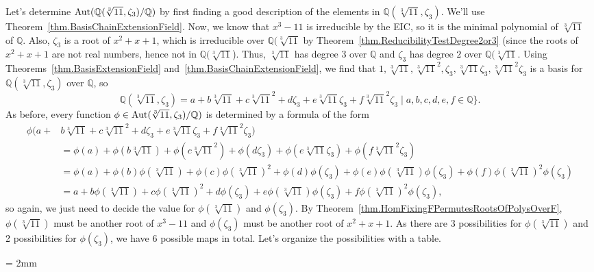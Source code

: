\begin{example}
Let's determine $\operatorname{Aut}(\mathbb{Q}(\sqrt[3]{11},\zeta_3)/\mathbb{Q})$ by first finding a good description of the elements in $\mathbb{Q}(\sqrt[3]{11},\zeta_3)$. We'll use Theorem~\ref{thm.BasisChainExtensionField}. Now, we know that $x^3-11$ is irreducible by the EIC, so it is the minimal polynomial of $\sqrt[3]{11}$ of $\mathbb{Q}$.  Also, $\zeta_3$ is a root of $x^2+x+1$, which is irreducible over $\mathbb{Q}(\sqrt[3]{11}$ by Theorem~\ref{thm.ReducibilityTestDegree2or3} (since the roots of $x^2+x+1$ are not real numbers, hence not in $\mathbb{Q}(\sqrt[3]{11}$). Thus, $\sqrt[3]{11}$ has degree $3$ over $\mathbb{Q}$ and $\zeta_3$ has degree $2$ over $\mathbb{Q}(\sqrt[3]{11}$. Using Theorems~\ref{thm.BasisExtensionField} and~\ref{thm.BasisChainExtensionField}, we find that $1,\sqrt[3]{11},\sqrt[3]{11}^2,\zeta_3,\sqrt[3]{11}\zeta_3,\sqrt[3]{11}^2\zeta_3$ is a basis for $\mathbb{Q}(\sqrt[3]{11},\zeta_3)$ over $\mathbb{Q}$, so 
\[\mathbb{Q}(\sqrt[3]{11},\zeta_3) = a+b\sqrt[3]{11}+c\sqrt[3]{11}^2+d\zeta_3+e\sqrt[3]{11}\zeta_3+f\sqrt[3]{11}^2\zeta_3\mid a,b,c,d,e,f\in\mathbb{Q}\}.\]
As before, every function $\phi\in \operatorname{Aut}(\sqrt[3]{11},\zeta_3)/\mathbb{Q})$ is determined by a formula of the form 
\begin{align*}
\phi(a+ &b\sqrt[3]{11}+  c\sqrt[3]{11}^2+d\zeta_3+e\sqrt[3]{11}\zeta_3+f\sqrt[3]{11}^2\zeta_3) \\
& = \phi(a)+\phi(b\sqrt[3]{11})+\phi(c\sqrt[3]{11}^2)+\phi(d\zeta_3)+\phi(e\sqrt[3]{11}\zeta_3)+\phi(f\sqrt[3]{11}^2\zeta_3)\\
& =\phi(a)+\phi(b)\phi(\sqrt[3]{11})+\phi(c)\phi(\sqrt[3]{11})^2+\phi(d)\phi(\zeta_3)+\phi(e)\phi(\sqrt[3]{11})\phi(\zeta_3)+\phi(f)\phi(\sqrt[3]{11})^2\phi(\zeta_3)\\
& =a+b\phi(\sqrt[3]{11})+c\phi(\sqrt[3]{11})^2+d\phi(\zeta_3)+e\phi(\sqrt[3]{11})\phi(\zeta_3)+f\phi(\sqrt[3]{11})^2\phi(\zeta_3),
\end{align*}
so again, we just need to decide the value for $\phi(\sqrt[3]{11})$ and $\phi(\zeta_3)$. By Theorem~\ref{thm.HomFixingFPermutesRootsOfPolysOverF}, $\phi(\sqrt[3]{11})$ must be another root of $x^3-11$ and $\phi(\zeta_3)$ must be another root of $x^2+x+1$. As there are 3 possibilities for $\phi(\sqrt[3]{11})$ and 2 possibilities for $\phi(\zeta_3)$, we have 6 possible maps in total. Let's organize the possibilities with a table.
\begin{flushleft}
\tabulinesep = 2mm
\end{flushleft}
\end{example}
